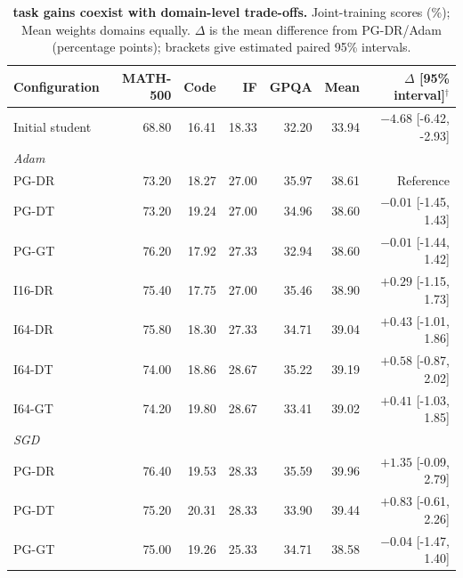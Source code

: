 \begin{table}[t]
\centering\small
\setlength{\tabcolsep}{3.5pt}
\caption{\textbf{task gains coexist with domain-level trade-offs.} Joint-training scores (\%); Mean weights domains equally. $\Delta$ is the mean difference from PG-DR/Adam (percentage points); brackets give estimated paired 95\% intervals.}
\label{tab:completed_endpoints}
\begin{tabular}{lrrrrrr}
\toprule
Configuration & MATH-500 & Code & IF & GPQA & Mean & $\Delta$ [95\% interval]$^{\dagger}$ \\
\midrule
Initial student & 68.80 & 16.41 & 18.33 & 32.20 & 33.94 & $-4.68$ [-6.42, -2.93] \\
\midrule
\multicolumn{7}{l}{\textit{Adam}} \\
PG-DR & 73.20 & 18.27 & 27.00 & 35.97 & 38.61 & Reference \\
PG-DT & 73.20 & 19.24 & 27.00 & 34.96 & 38.60 & $-0.01$ [-1.45, 1.43] \\
PG-GT & 76.20 & 17.92 & 27.33 & 32.94 & 38.60 & $-0.01$ [-1.44, 1.42] \\
I16-DR & 75.40 & 17.75 & 27.00 & 35.46 & 38.90 & $+0.29$ [-1.15, 1.73] \\
I64-DR & 75.80 & 18.30 & 27.33 & 34.71 & 39.04 & $+0.43$ [-1.01, 1.86] \\
I64-DT & 74.00 & 18.86 & 28.67 & 35.22 & 39.19 & $+0.58$ [-0.87, 2.02] \\
I64-GT & 74.20 & 19.80 & 28.67 & 33.41 & 39.02 & $+0.41$ [-1.03, 1.85] \\
\midrule
\multicolumn{7}{l}{\textit{SGD}} \\
PG-DR & 76.40 & 19.53 & 28.33 & 35.59 & 39.96 & $+1.35$ [-0.09, 2.79] \\
PG-DT & 75.20 & 20.31 & 28.33 & 33.90 & 39.44 & $+0.83$ [-0.61, 2.26] \\
PG-GT & 75.00 & 19.26 & 25.33 & 34.71 & 38.58 & $-0.04$ [-1.47, 1.40] \\
\bottomrule
\end{tabular}
\par\vspace{2pt}
\end{table}
